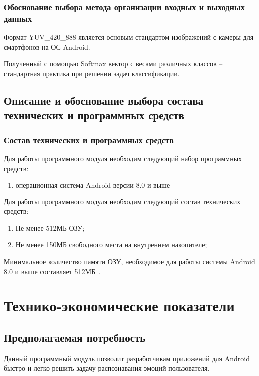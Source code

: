 \documentclass[a4paper,12pt]{article}
\begin{document}
    \subsubsection{Обоснование выбора метода организации входных и выходных данных}

    Формат YUV\_420\_888 является основым стандартом изображений с камеры для смартфонов на ОС Android.

    Полученный с помощью Softmax вектор с весами различных классов -- стандартная практика при решении задач классификации.

    \subsection{Описание и обоснование выбора состава технических и программных средств}

    \subsubsection{Состав технических и программных средств}
    Для работы программного модуля необходим следующий набор программных средств:
    \begin{enumerate}
        \item операционная система Android версии 8.0 и выше
    \end{enumerate}

    Для работы программного модуля необходим следующий состав технических средств:
    \begin{enumerate}
        \item Не менее 512МБ ОЗУ;
        \item Не менее 150МБ свободного места на внутреннем накопителе;
    \end{enumerate}

    Минимальное количество памяти ОЗУ, необходимое для работы системы Android 8.0 и выше составляет 512МБ~\cite{AndroidReq}.

    \newpage
    \section{Технико-экономические показатели}

    \subsection{Предполагаемая потребность}
    Данный программный модуль позволит разработчикам приложений для Android быстро и легко решить задачу распознавания эмоций пользователя.
\end{document}
